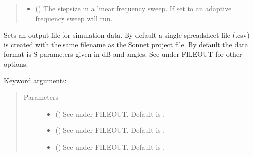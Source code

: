 \documentclass[letterpaper,10pt,english,openany]{sphinxmanual}
\begin{document}
\begin{fulllineitems}
\begin{fulllineitems}
\begin{quote}
\begin{description}
\begin{itemize}
\item {} 
 () \textendash{} The stepsize in a linear frequency sweep. If set to  an adaptive frequency sweep will run.

\end{itemize}

\end{description}\end{quote}

\end{fulllineitems}


\begin{fulllineitems}
\label{\detokenize{source/sonpy:sonpy.sonnet.setOutput}}
Sets an output file for simulation data. By default a single spreadsheet file (.csv) is created with the same filename as the Sonnet project file. By default the data format is S-parameters given in dB and angles. See \label{\detokenize{source/sonpy:id30}}{\hyperref[\detokenize{source/users_guide:son15}]{\sphinxcrossref{{[}Son15{]}}}} under FILEOUT for other options.

Keyword arguments:
\begin{quote}\begin{description}
\item[{Parameters}] \leavevmode\begin{itemize}
\item {} 
 () \textendash{} See \label{\detokenize{source/sonpy:id31}}{\hyperref[\detokenize{source/users_guide:son15}]{\sphinxcrossref{{[}Son15{]}}}} under FILEOUT. Default is .

\item {} 
 () \textendash{} See \label{\detokenize{source/sonpy:id32}}{\hyperref[\detokenize{source/users_guide:son15}]{\sphinxcrossref{{[}Son15{]}}}} under FILEOUT. Default is .

\item {} 
 () \textendash{} See \label{\detokenize{source/sonpy:id33}}{\hyperref[\detokenize{source/users_guide:son15}]{\sphinxcrossref{{[}Son15{]}}}} under FILEOUT. Default is .


\end{itemize}
\end{description}
\end{quote}
\end{fulllineitems}
\end{fulllineitems}
\end{document}
